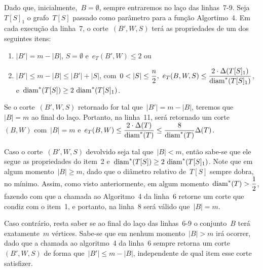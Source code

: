 		



		\bigskip

		Dado que, inicialmente,~$B=\emptyset$, sempre entraremos no laço das
		linhas~7-9.
		Seja~$T[S]_1$ o grafo~$T[S]$ passado como parâmetro para a função Algortimo~4.
		Em cada execução da linha~7, o corte~$(B',W,S)$
		terá as propriedades de um dos seguintes itens:
		\begin{enumerate}
			\item $|B'|=m-|B|$, $S=\emptyset$ e~$e_T(B',W)\le 2$ ou
			\item ${|B'|\le m-|B|\le |B'|+|S|}$, 
				com~${0<|S|\le\dfrac{n}{2},\
				e_T(B,W,S)\le \dfrac{2\cdot 
				\Delta(T[S]_1)}{\diam^*(T[S]_1)}}$, 
				e~${\diam^*(T[S])\ge 2\ \diam^*(T[S]_1)}$.
		\end{enumerate} 
		Se o corte~$(B',W,S)$ 
		retornado for tal que~$|B'| = m-|B|$, teremos que~$|B|=m$
		ao final do laço.
		Portanto, na linha~11, será retornado um corte~$(B,W)$ 
		com~$|B| = m$ e~$e_T(B,W) \le \dfrac{2\cdot 
			\Delta(T)}{\mathrm{diam}^*(T)}\le \dfrac{8}{\mathrm{diam}^*(T)}\Delta(T)$.

		Caso o corte~$(B',W,S)$ devolvido seja tal que~$|B|<m$,
		então sabe-se que ele segue as propriedades do item~2
		e~${\diam^*(T[S])\ge 2\ \diam^*(T[S]_1)}$.
		Note que em algum momento~$|B|\ge m$,
		dado que o diâmetro relativo de~$T[S]$ sempre
		dobra, no mínimo.
		Assim, como visto anteriormente,
		em algum momento~$\mathrm{diam}^*(T)>\dfrac{1}{2}$, fazendo
		com que a chamada ao Algoritmo~4 da linha~6 retorne um corte
		que condiz com o item~1, e portanto, na linha~8 será válido 
		que~$|B| = m$.
		
		Caso contrário, resta saber se ao final do laço das linhas~6-9
		o conjunto~$B$ terá 
		exatamente~$m$ vértices.
		Sabe-se que em nenhum momento~$|B|>m$ irá ocorrer, dado que a chamada ao algoritmo~4
		da linha~6 sempre retorna um corte~$(B',W,S)$ de forma que~$|B'|\le m-|B|$,
		independente de qual item esse corte satisfizer.


